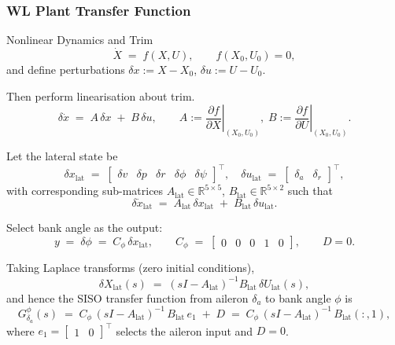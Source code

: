 \subsubsection{WL Plant Transfer Function}
Nonlinear Dynamics and Trim
\begin{equation}
\dot{X} \;=\; f(X,U), \qquad f(X_0,U_0)=0,
\end{equation}
and define perturbations \(\delta x := X - X_0\), \(\delta u := U - U_0\).

Then perform linearisation about trim.
\begin{equation}
\delta \dot{x} \;=\; A\,\delta x \;+\; B\,\delta u, 
\qquad
A := \left.\frac{\partial f}{\partial X}\right|_{(X_0,U_0)},\;
B := \left.\frac{\partial f}{\partial U}\right|_{(X_0,U_0)}.
\end{equation}

Let the lateral state be
\begin{equation}
\delta x_{\mathrm{lat}} \;=\; \begin{bmatrix} \delta v & \delta p & \delta r & \delta\phi & \delta\psi \end{bmatrix}^{\!\top},
\quad
\delta u_{\mathrm{lat}} \;=\; \begin{bmatrix} \delta_a & \delta_r \end{bmatrix}^{\!\top},
\end{equation}
with corresponding sub-matrices \(A_{\mathrm{lat}}\in\mathbb{R}^{5\times 5}\), \(B_{\mathrm{lat}}\in\mathbb{R}^{5\times 2}\) such that
\begin{equation}
\delta \dot{x}_{\mathrm{lat}} \;=\; A_{\mathrm{lat}}\,\delta x_{\mathrm{lat}} \;+\; B_{\mathrm{lat}}\,\delta u_{\mathrm{lat}}.
\end{equation}

Select bank angle as the output:
\[
y \;=\; \delta\phi \;=\; C_\phi\,\delta x_{\mathrm{lat}}, 
\qquad
C_\phi \;=\; \begin{bmatrix} 0 & 0 & 0 & 1 & 0 \end{bmatrix},
\qquad D=0.
\]

Taking Laplace transforms (zero initial conditions),
\[
\delta X_{\mathrm{lat}}(s) \;=\; (sI - A_{\mathrm{lat}})^{-1} B_{\mathrm{lat}} \,\delta U_{\mathrm{lat}}(s),
\]
and hence the SISO transfer function from aileron \(\delta_a\) to bank angle \(\phi\) is
\[
G^{\phi}_{\delta_a}(s)
\;=\;
C_\phi \,(sI - A_{\mathrm{lat}})^{-1}\, B_{\mathrm{lat}} \, e_1 \;+\; D
\;=\;
C_\phi \,(sI - A_{\mathrm{lat}})^{-1}\, B_{\mathrm{lat}}(:,1),
\]
where \(e_1 = \begin{bmatrix}1 & 0\end{bmatrix}^{\!\top}\) selects the aileron input and \(D=0\).

